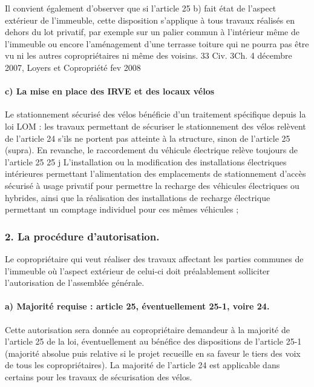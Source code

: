 				Il convient également d'observer que si l'article 25 b) fait état de l'aspect extérieur de l'immeuble, cette disposition s'applique à tous travaux réalisés en dehors du lot privatif, par exemple sur un palier commun à l'intérieur même de l'immeuble ou encore l'aménagement d'une terrasse toiture qui ne pourra pas être vu ni les autres copropriétaires ni même des voisins.
			33 Civ. 3\degres Ch. 4 décembre 2007, Loyers et Copropriété fev 2008 
			\paragraph{c) La mise en place des IRVE et des locaux vélos}
			
				Le stationnement sécurisé des vélos bénéficie d’un traitement spécifique depuis la loi LOM : les travaux permettant de sécuriser le stationnement des vélos relèvent de l’article 24 s’ils ne portent pas atteinte à la structure, sinon de l’article 25 (supra).
				En revanche, le raccordement du véhicule électrique relève toujours de l’article 25
				25 j L'installation ou la modification des installations électriques intérieures permettant l'alimentation des emplacements de stationnement d'accès sécurisé à usage privatif pour permettre la recharge des véhicules électriques ou hybrides, ainsi que la réalisation des installations de recharge électrique permettant un comptage individuel pour ces mêmes véhicules ;
		
		\subsubsection{2. La procédure d’autorisation.}
		
			Le copropriétaire qui veut réaliser des travaux affectant les parties communes de l'immeuble où l'aspect extérieur de celui-ci doit préalablement solliciter l'autorisation de l'assemblée générale.
			
			\paragraph{a) Majorité requise : article 25, éventuellement 25-1, voire 24.}
			
				Cette autorisation sera donnée au copropriétaire demandeur à la majorité de l'article 25 de la loi, éventuellement au bénéfice des dispositions de l'article 25-1 (majorité absolue puis relative si le projet recueille en sa faveur le tiers des voix de tous les copropriétaires). La majorité de l’article 24 est applicable dans certains pour les travaux de sécurisation des vélos.
			
